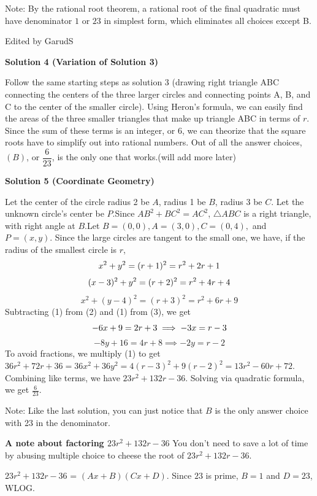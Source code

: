 \begin{enumerate}
 Note: By the rational root theorem, a rational root of the final quadratic must have denominator $1$ or $23$ in simplest form, which eliminates all choices except B.

 Edited by GarudS

 



\textbf{Solution 4 (Variation of Solution 3)}

Follow the same starting steps as solution 3 (drawing right triangle ABC connecting the centers of the three larger circles and connecting points A, B, and C to the center of the smaller circle). Using Heron's formula, we can easily find the areas of the three smaller triangles that make up triangle ABC in terms of $r$. Since the sum of these terms is an integer, or 6, we can theorize that the square roots have to simplify out into rational numbers. Out of all the answer choices, $\boxed{(B)}$, or $\dfrac{6}{23}$, is the only one that works.(will add more later)

 



\textbf{Solution 5 (Coordinate Geometry)}

Let the center of the circle radius 2 be $A$, radius 1 be $B$, radius 3 be $C$. Let the unknown circle's center be $P$.Since $AB^2+BC^2=AC^2$, $\triangle ABC$ is a right triangle, with right angle at $B$.Let $B=(0, 0), A=(3, 0), C=(0, 4),$ and $P=(x, y)$. Since the large circles are tangent to the small one, we have, if the radius of the smallest circle is $r$,
 \[x^2+y^2 = (r+1)^2 = r^2+2r+1 \\\]
 \[(x-3)^2+y^2 = (r+2)^2 = r^2+4r+4 \\\]
 \[x^2+(y-4)^2 = (r+3)^2 = r^2+6r+9\]Subtracting (1) from (2) and (1) from (3), we get
 \[-6x+9=2r+3 \implies -3x=r-3\\\]
 \[-8y+16=4r+8 \implies -2y=r-2\]To avoid fractions, we multiply (1) to get $36r^2+72r+36=36x^2+36y^2=4(r-3)^2+9(r-2)^2 = 13r^2-60r+72$. Combining like terms, we have $23r^2+132r-36$. Solving via quadratic formula, we get $\boxed{\frac{6}{23}}$.

 Note: Like the last solution, you can just notice that $B$ is the only answer choice with 23 in the denominator.

 \textbf{A note about factoring $23r^2+132r-36$} You don't need to save a lot of time by abusing multiple choice to cheese the root of $23r^2+132r-36$.

 $23r^2+132r-36$ = $(Ax+B)(Cx+D)$. Since $23$ is prime, $B=1$ and $D=23$, WLOG.


\end{enumerate}
